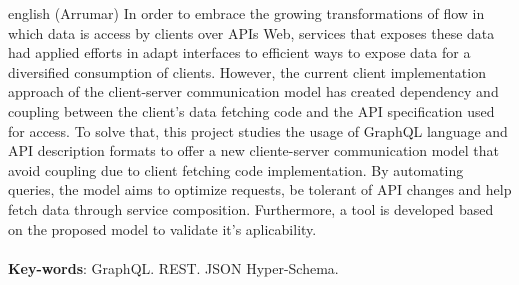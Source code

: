 \begin{resumo}[Abstract]
  \begin{otherlanguage*}{english}
  (Arrumar) In order to embrace the growing transformations of flow in which data is access by clients over APIs Web, services that exposes these data had applied efforts in adapt interfaces to  efficient ways to expose data for a diversified consumption of clients. However, the current client implementation approach of the client-server communication model has created dependency and coupling between the client's data fetching code and the API specification used for access. To solve that, this project studies the usage of GraphQL language and API description formats to offer a new cliente-server communication model that avoid coupling due to client fetching code implementation. By automating queries, the model aims to optimize requests, be tolerant of API changes and help fetch data through service composition. Furthermore, a tool is developed based on the proposed model to validate it's aplicability. \\ \\
    \textbf{Key-words}: GraphQL. REST. JSON Hyper-Schema.
  \end{otherlanguage*}
\end{resumo}
